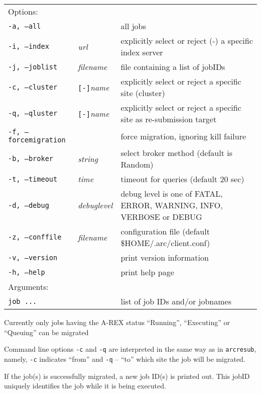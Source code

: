 \hspace*{0.5cm}
\begin{shaded}
\end{shaded}
\begin{longtable}{llp{8cm}}
   Options:&&\\
   \texttt{-a, --all}& & all jobs\\
   \texttt{-i, --index}&\textit{url}&explicitly select or reject (-) a specific index server\\
   \texttt{-j, --joblist}& \textit{filename} & file containing a list of jobIDs\\
   \texttt{-c, --cluster}&\verb#[-]#\textit{name}&explicitly select or reject a specific site (cluster)\\
   \texttt{-q, --qluster}&\verb#[-]#\textit{name}&explicitly select or reject a specific site as re-submission target\\
   \texttt{-f, --forcemigration}& & force migration, ignoring kill failure\\
   \texttt{-b, --broker}&\textit{string}&select broker method (default is Random)\\
   \texttt{-t, --timeout}& \textit{time} & timeout for queries (default 20 sec)\\
   \texttt{-d, --debug}& \textit{debuglevel}&debug level is one of  FATAL, ERROR, WARNING, INFO, VERBOSE or DEBUG\\
   \texttt{-z, --conffile}&\textit{filename}& configuration file (default {\$}HOME/.arc/client.conf)\\
   \texttt{-v, --version}& & print version information\\
   \texttt{-h, --help}& & print help page\\
   Arguments:&&\\
   \texttt{job ...} && list of job IDs and/or jobnames\\
\end{longtable}

\begin{framed}
Currently only jobs having the A-REX status ``Running'', ``Executing'' or ``Queuing'' can be migrated
\end{framed}

Command line options \verb#-c# and \verb #-q# are interpreted in the same way as in \verb#arcresub#, namely,
\verb#-c# indicates ``from'' and \verb #-q# -- ``to'' which site the job will be migrated.

If the job(s) is successfully migrated, a new job ID(s) is printed out. This jobID uniquely
identifies the job while it is being executed.
